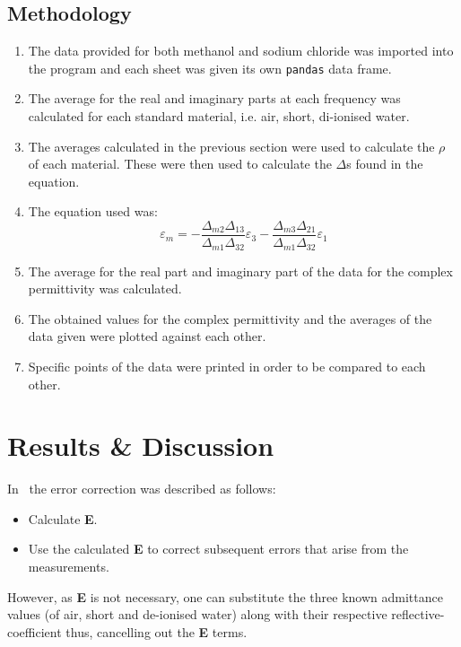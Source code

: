 \documentclass[12pt, a4paper]{article}
\begin{document}
\begin{multicols*}{2}
\subsection{Methodology}
\begin{enumerate}
    \item The data provided for both methanol and sodium chloride was imported into the program and each sheet was given its own \texttt{pandas} data frame.
    \item The average for the real and imaginary parts at each frequency was calculated for each standard material, i.e. air, short, di-ionised water.
    \item The averages calculated in the previous section were used to calculate the \(\rho\) of each material. These were then used to calculate the \(\Delta\)s found in the equation.
    \item The equation used was:
            \begin{equation}
                \varepsilon_m = -\frac{\Delta_{m2}\Delta_{13}}{\Delta_{m1}\Delta_{32}}\varepsilon_3 - \frac{\Delta_{m3}\Delta_{21}}{\Delta_{m1}\Delta_{32}}\varepsilon_1
            \end{equation}
    \item The average for the real part and imaginary part of the data for the complex permittivity was calculated.
    \item The obtained values for the complex permittivity and the averages of the data given were plotted against each other.
    \item Specific points of the data were printed in order to be compared to each other.
\end{enumerate}

\section{Results \& Discussion}
In~\cite{marsland1987dielectric} the error correction was described as follows:
\begin{itemize}
    \item Calculate \textbf{E}.
    \item Use the calculated \textbf{E} to correct subsequent errors that arise from the measurements.
\end{itemize}
However, as \textbf{E} is not necessary, one can substitute the three known admittance values (of air, short and de-ionised water) along with their respective reflective-coefficient thus, cancelling out the \textbf{E} terms.


\end{multicols*}
\end{document}
